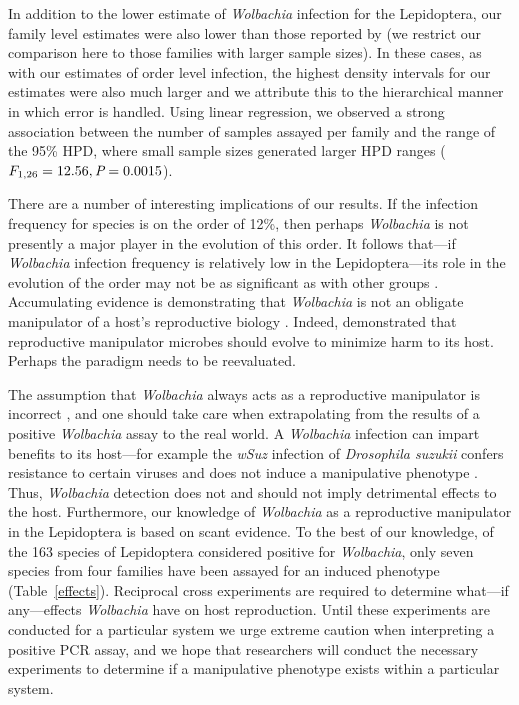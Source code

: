 \documentclass{frontiersSCNS}
\begin{document}
In addition to the lower estimate of \emph{Wolbachia} infection for the Lepidoptera, our family level estimates were also lower than those reported by \cite{Ahmed:2015aa} (we restrict our comparison here to those families with larger sample sizes). In these cases, as with our estimates of order level infection, the highest density intervals for our estimates were also much larger and we attribute this to the hierarchical manner in which error is handled. Using linear regression, we observed a strong association between the number of samples assayed per family and the range of the 95\% HPD, where small sample sizes generated larger HPD ranges ($F_{1,26} = 12.56, \emph{P} = 0.0015$).

There are a number of interesting implications of our results. If the infection frequency for species is on the order of 12\%, then perhaps \emph{Wolbachia} is not presently a major player in the evolution of this order.  It follows that---if \emph{Wolbachia} infection frequency is relatively low in the Lepidoptera---its role in the evolution of the order may not be as significant as with other groups \citep{Miller:2010ki}. Accumulating evidence is demonstrating that \emph{Wolbachia} is not an obligate manipulator of a host's reproductive biology \citep{Hamm:2014cv,Zhang:2010jl,Zhang:2013eo}. Indeed, \citet{Prout:1994th} demonstrated that reproductive manipulator microbes should evolve to minimize harm to its host. Perhaps the paradigm needs to be reevaluated. 

The assumption that \emph{Wolbachia} always acts as a reproductive manipulator is incorrect \citep{Nice:2009p7399,Hamm:2014wi}, and one should take care when extrapolating from the results of a positive \emph{Wolbachia} assay to the real world. A \emph{Wolbachia} infection can impart benefits to its host---for example the \emph{wSuz} infection of \emph{Drosophila suzukii} confers resistance to certain viruses \citep{Cattel:IMB12245} and does not induce a manipulative phenotype \citep{Hamm:2014cv}. Thus,  \emph{Wolbachia} detection does not and should not imply detrimental effects to the host. Furthermore, our knowledge of \emph{Wolbachia} as a reproductive manipulator in the Lepidoptera is based on scant evidence. To the best of our knowledge, of the 163 species of Lepidoptera considered positive for \emph{Wolbachia}, only seven species from four families have been assayed for an induced phenotype (Table~\ref{effects}). Reciprocal cross experiments are required to determine what---if any---effects \emph{Wolbachia} have on host reproduction. Until these experiments are conducted for a particular system we urge extreme caution when interpreting a positive PCR assay, and we hope that researchers will conduct the necessary experiments to determine if a manipulative phenotype exists within a particular system. 
\end{document}
